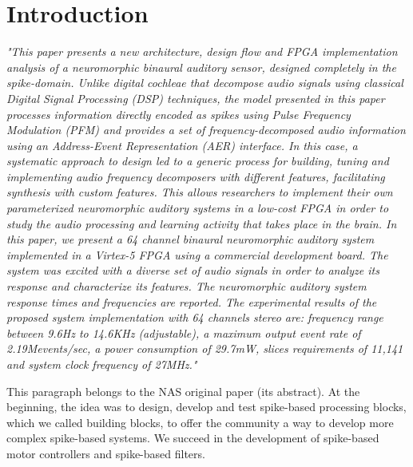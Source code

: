 \section{Introduction}
\label{sec:Introduction}
\textit{"This paper presents a new architecture, design flow and FPGA implementation analysis of a neuromorphic binaural auditory sensor, designed completely in the spike-domain. Unlike digital cochleae that decompose audio signals using classical Digital Signal Processing (DSP) techniques, the model presented in this paper processes information directly encoded as spikes using Pulse Frequency Modulation (PFM) and provides a set of frequency-decomposed audio information using an Address-Event Representation (AER) interface. In this case, a systematic approach to design led to a generic process for building, tuning and implementing audio frequency decomposers with different features, facilitating synthesis with custom features. This allows researchers to implement their own parameterized neuromorphic auditory systems in a low-cost FPGA in order to study the audio processing and learning activity that takes place in the brain. In this paper, we present a 64 channel binaural neuromorphic auditory system implemented in a Virtex-5 FPGA using a commercial development board. The system was excited with a diverse set of audio signals in order to analyze its response and characterize its features. The neuromorphic auditory system response times and frequencies are reported. The experimental results of the proposed system implementation with 64 channels stereo are: frequency range between 9.6Hz to 14.6KHz (adjustable), a maximum output event rate of 2.19Mevents/sec, a power consumption of 29.7mW, slices requirements of 11,141 and system clock frequency of 27MHz."} 


This paragraph belongs to the NAS \cite{jimenez2017binaural} original paper (its abstract). At the beginning, the idea was to design, develop and test spike-based processing blocks, which we called building blocks, to offer the community a way to develop more complex spike-based systems. We succeed in the development of spike-based motor controllers and spike-based filters.

